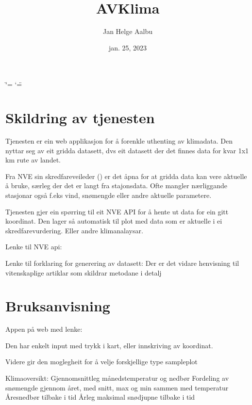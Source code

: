 \documentclass[letterpaper,10pt,norsk]{sphinxmanual}
\title{AV\sphinxhyphen{}Klima}
\date{jan. 25, 2023}
\author{Jan Helge Aalbu}
\begin{document}
\ifdefined\shorthandoff
  \ifnum\catcode`\=\string=\active\shorthandoff{=}\fi
  \ifnum\catcode`\"=\active{}\fi
\fi

\pagestyle{empty}
\sphinxmaketitle
\pagestyle{plain}
\sphinxtableofcontents
\pagestyle{normal}
\label{\detokenize{index::doc}}



\chapter{Skildring av tjenesten}
\label{\detokenize{index:skildring-av-tjenesten}}
\sphinxAtStartPar
Tjenesten er ein web applikasjon for å forenkle uthenting av klimadata. Den nyttar
seg av eit gridda datasett, dvs eit datasett der det finnes data for kvar 1x1 km rute
av landet.

\sphinxAtStartPar
Fra NVE sin skredfareveileder ()
er det åpna for at gridda data kan vere aktuelle å bruke, særleg der det er langt fra stajonsdata.
Ofte mangler nærliggande stasjonar også f.eks vind, snømengde eller andre aktuelle parametere.

\sphinxAtStartPar
Tjenesten gjer ein spørring til eit NVE API for å hente ut data for ein gitt koordinat. Den
lager så automatisk til plot med data som er aktuelle i ei skredfarevurdering. Eller andre
klimanalaysar.

\sphinxAtStartPar
Lenke til NVE api:

\sphinxAtStartPar
Lenke til forklaring for generering av datasett:
Der er det vidare henvisning til vitenskaplige artiklar som skildrar metodane i detalj


\chapter{Bruksanvisning}
\label{\detokenize{index:bruksanvisning}}
\sphinxAtStartPar
Appen på web med lenke: 

\sphinxAtStartPar
Den har enkelt input med trykk i kart, eller innskriving av koordinat.

\sphinxAtStartPar
Videre gir den moglegheit for å velje forskjellige type sampleplot

\sphinxAtStartPar
Klimaoversikt:
\sphinxhyphen{} Gjennomsnittleg månedstemperatur og nedbør
\sphinxhyphen{} Fordeling av snømengde gjennom året, med snitt, max og min sammen med temperatur
\sphinxhyphen{} Åresnedbør tilbake i tid
\sphinxhyphen{} Årleg maksimal snødjupne tilbake i tid
\end{document}
